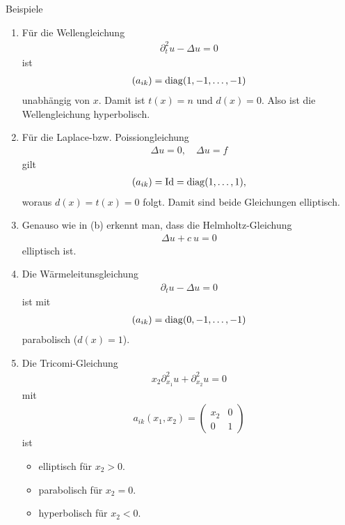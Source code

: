 \begin{genericdf}{Beispiele}
\renewcommand{\labelenumi}{(\alph{enumi})}
\begin{enumerate}
\item 
Für die Wellengleichung 
\begin{align*}
\partial^2_t u - \Delta u = 0
\end{align*}
ist
\begin{align*}
(a_{ik}) = \operatorname{diag}(1,-1, \dots, -1)
\end{align*}
unabhängig von $x$.
Damit ist $t(x) = n$ und $d(x) = 0$.
Also ist die Wellengleichung hyperbolisch.

\item
Für die Laplace-bzw. Poissiongleichung
\begin{align*}
\Delta u = 0, \quad \Delta u = f
\end{align*}
gilt
\begin{align*}
(a_{ik}) = \operatorname{Id} = \operatorname{diag}(1, \dots, 1),
\end{align*}
woraus $d(x) = t(x) = 0$ folgt.
Damit sind beide Gleichungen elliptisch.

\item
Genauso wie in (b) erkennt man, dass die Helmholtz-Gleichung
\begin{align*}
\Delta u + c \ u = 0
\end{align*}
elliptisch ist.

\item
Die Wärmeleitunsgleichung 
\begin{align*}
\partial_t u - \Delta u  = 0 
\end{align*}
ist mit 
\begin{align*}
(a_{ik}) = \operatorname{diag}(0,-1, \dots , -1)
\end{align*}
parabolisch ($d(x) = 1$).

\item
Die Tricomi-Gleichung
\begin{align*}
x_2 \partial_{x_1}^2 u + \partial_{x_2}^2 u = 0
\end{align*}
mit 
\begin{align*}
a_{ik}(x_1,x_2) = 
\begin{pmatrix}
x_2 & 0 \\
0  & 1 
\end{pmatrix}
\end{align*}
ist 
\begin{itemize}
\item elliptisch für $x_2 > 0$.
\item parabolisch für $x_2 = 0$.
\item hyperbolisch für $x_2 < 0$.
\end{itemize}
\end{enumerate}
\end{genericdf}

